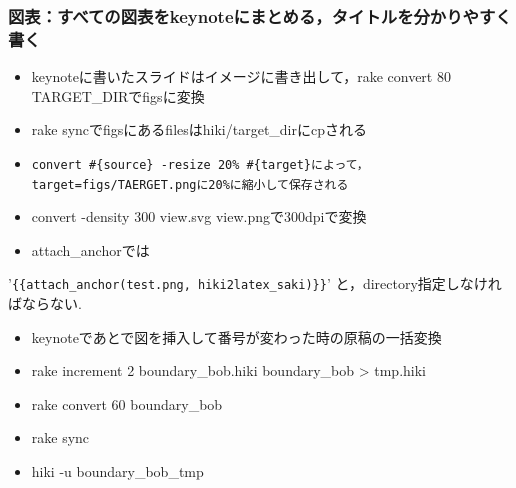 \subsubsection{図表：すべての図表をkeynoteにまとめる，タイトルを分かりやすく書く}\begin{itemize}
\item keynoteに書いたスライドはイメージに書き出して，rake convert 80 TARGET\_DIRでfigsに変換
\item rake syncでfigsにあるfilesはhiki/target\_dirにcpされる
\item \verb|convert #{source} -resize 20% #{target}によって，target=figs/TAERGET.pngに20%に縮小して保存される|
\item convert -density 300 view.svg view.pngで300dpiで変換
\item attach\_anchorでは
\end{itemize}
'\verb|{{attach_anchor(test.png, hiki2latex_saki)}}|'
と，directory指定しなければならない.
\begin{itemize}
\item keynoteであとで図を挿入して番号が変わった時の原稿の一括変換
\item rake increment 2 boundary\_bob.hiki boundary\_bob > tmp.hiki
\item rake convert 60 boundary\_bob
\item rake sync
\item hiki -u boundary\_bob\_tmp
\end{itemize}
